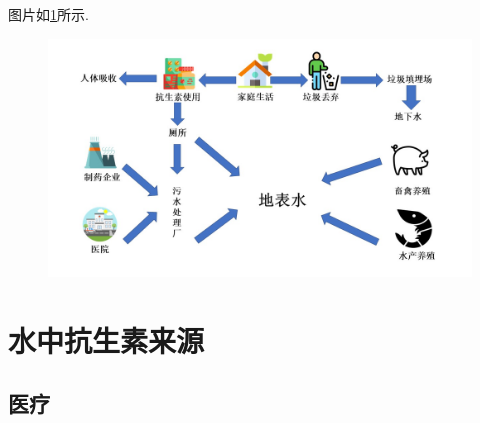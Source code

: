 \documentclass{SCIS2020cn}
\begin{document}
图片如\ref{fig1}所示.
\begin{figure}[ht]
\centering
\includegraphics[scale=0.25]{1.jpg}

\label{fig1}
\end{figure}

\section{水中抗生素来源}
\subsection{医疗}
\end{document}
